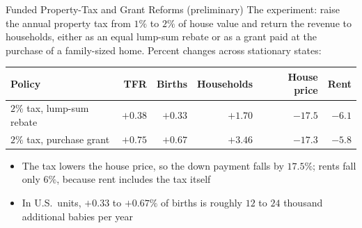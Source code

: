 \documentclass[11pt,aspectratio=169]{beamer}
\begin{document}
\begin{frame}{Funded Property-Tax and Grant Reforms (preliminary)}
The experiment: raise the annual property tax from $1\%$ to $2\%$ of house value and return the revenue to households, either as an equal lump-sum rebate or as a grant paid at the purchase of a family-sized home. Percent changes across stationary states:
\medskip

\centering
\small
\renewcommand{\arraystretch}{0.95}
\begin{tabular}{lrrrrr}
\toprule
Policy & TFR & Births & Households & House price & Rent \\
\midrule
$2\%$ tax, lump-sum rebate & $+0.38$ & $+0.33$ & $+1.70$ & $-17.5$ & $-6.1$ \\
$2\%$ tax, purchase grant  & $+0.75$ & $+0.67$ & $+3.46$ & $-17.3$ & $-5.8$ \\
\bottomrule
\end{tabular}

\medskip
\raggedright
\begin{itemize}
  \item The tax lowers the house price, so the down payment falls by $17.5\%$; rents fall only $6\%$, because rent includes the tax itself
  \item In U.S.\ units, $+0.33$ to $+0.67\%$ of births is roughly $12$ to $24$ thousand additional babies per year
\end{itemize}
\end{frame}
\end{document}
